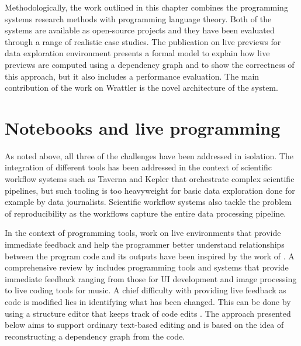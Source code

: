 \documentclass[fleqn,11pt]{report}
\theoremstyle{definition}
\begin{document}
Methodologically, the work outlined in this chapter combines the programming systems research
methods with programming language theory. Both of the systems are available as open-source
projects and they have been evaluated through a range of realistic case studies. The publication
on live previews for data exploration environment presents a formal model to explain how
live previews are computed using a dependency graph and to show the correctness of this approach,
but it also includes a performance evaluation. The main contribution of the work on Wrattler
is the novel architecture of the system.

\section{Notebooks and live programming}

As noted above, all three of the challenges have been addressed in isolation. The integration of
different tools has been addressed in the context of scientific workflow systems such as
Taverna \citep{oinn-2004-taverna} and Kepler \citep{altintas-2004-kepler} that orchestrate
complex scientific pipelines, but such tooling is too heavyweight for basic data exploration
done for example by data journalists. Scientific workflow systems also tackle the problem
of reproducibility as the workflows capture the entire data processing pipeline.

In the context of programming tools, work on live environments that provide immediate feedback
and help the programmer better understand relationships between the program code and its outputs
have been inspired by the work of \cite{victor-2012-learnable,victor-2012-principle}. A
comprehensive review by \cite{rein-2019-review} includes programming tools and systems that
provide immediate feedback ranging from those for UI development and image processing to live
coding tools for music. A chief difficulty with providing live feedback as code is modified
lies in identifying what has been changed. This can be done by using a structure editor that
keeps track of code edits \citep{omar-2019-live}. The approach presented below aims to support
ordinary text-based editing and is based on the idea of reconstructing a dependency graph from
the code.
\end{document}
